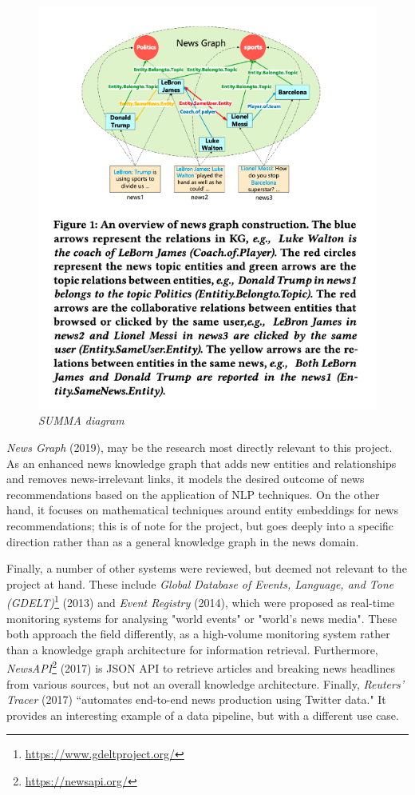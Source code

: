 \documentclass[11pt]{article}
\begin{document}
\begin{figure}
  \centerline{\includegraphics[scale=0.4]{literature-review--newsgraph.png}}
  \caption{\textit{SUMMA diagram}}
\end{figure}

\textit{News Graph} \cite{liu2019news} (2019), may be the research most directly relevant to this project. As an enhanced news knowledge graph that adds new entities and relationships and removes news-irrelevant links, it models the desired outcome of news recommendations based on the application of NLP techniques. On the other hand, it focuses on mathematical techniques around entity embeddings for news recommendations; this is of note for the project, but goes deeply into a specific direction rather than as a general knowledge graph in the news domain.

Finally, a number of other systems were reviewed, but deemed not relevant to the project at hand. These include \textit{Global Database of Events, Language, and Tone (GDELT)}\footnote{\url{https://www.gdeltproject.org/}} (2013) and \textit{Event Registry} \cite{leban2014event} (2014), which were proposed as real-time monitoring systems for analysing "world events" or "world's news media". These both approach the field differently, as a high-volume monitoring system rather than a knowledge graph architecture for information retrieval. Furthermore, \textit{NewsAPI}\footnote{\url{https://newsapi.org/}} (2017) is JSON API to retrieve articles and breaking news headlines from various sources, but not an overall knowledge architecture. Finally, \textit{Reuters' Tracer} \cite{liu2017reuters} (2017) ``automates end-to-end news production using Twitter data." It provides an interesting example of a data pipeline, but with a different use case.
\end{document}
